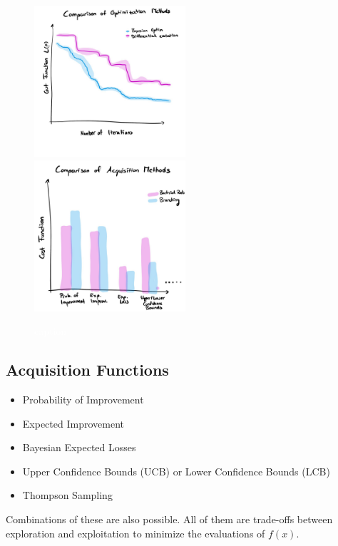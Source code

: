 \documentclass{article}
\newcommand{\todo}[1]{\colorbox{WildStrawberry}{\textcolor{white}{#1}}}
\begin{document}
\begin{figure}[H]
    \centering
    \includegraphics[width=0.5\textwidth]{figures/optim-cost-function-temp.jpg}%
    \includegraphics[width=0.5\textwidth]{figures/optim-acquisition-function-comparison.jpg}
    \caption{\todo{caption}}
    \label{fig:optim-comparison-cost-function}
\end{figure}

\subsection{Acquisition Functions}
\begin{itemize}
    \item Probability of Improvement
    \item Expected Improvement
    \item Bayesian Expected Losses
    \item Upper Confidence Bounds (UCB) or Lower Confidence Bounds (LCB)
    \item Thompson Sampling
\end{itemize}
Combinations of these are also possible.
All of them are trade-offs between exploration and exploitation to minimize the evaluations of
$f(x)$.
\end{document}
